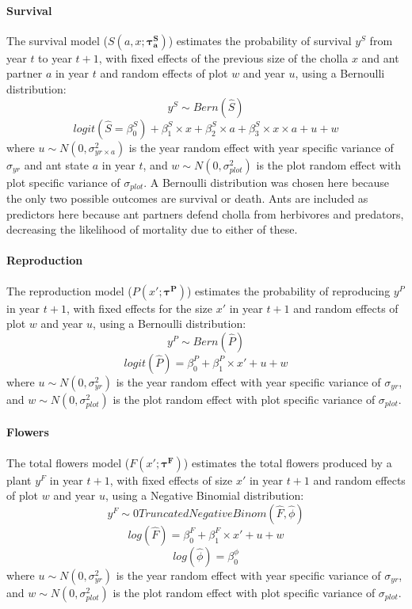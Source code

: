 \documentclass[11pt]{article}
\begin{document}
\paragraph{Survival}
The survival model ($S(a,x;\pmb{\tau_{a}^{S}})$) estimates the probability of survival $y^S$ from year $t$ to year $t+1$, with fixed effects of the previous size of the cholla $x$ and ant partner $a$ in year $t$ and random effects of plot $w$ and year $u$, using a Bernoulli distribution:
$$y^S \sim Bern(\hat{S})$$
$$logit(\hat{S} = \beta_{0}^{S}) + \beta_{1}^{S} \times x + \beta_{2}^{S} \times a + \beta_{3}^{S} \times x \times a + u + w$$
where $u \sim N(0,\sigma_{yr \times a}^{2})$ is the year random effect with year specific variance of $\sigma_{yr}$ and ant state $a$ in year $t$, and $w \sim N(0,\sigma_{plot}^{2})$ is the plot random effect with plot specific variance of $\sigma_{plot}$.
A Bernoulli distribution was chosen here because the only two possible outcomes are survival or death. 
Ants are included as predictors here because ant partners defend cholla from herbivores and predators, decreasing the likelihood of mortality due to either of these. 

\paragraph{Reproduction}
The reproduction model ($P(x';\pmb{\tau^{P}})$) estimates the probability of reproducing $y^P$ in year $t+1$, with fixed effects for the size $x'$ in year $t+1$ and random effects of plot $w$ and year $u$, using a Bernoulli distribution:
$$y^P \sim Bern(\hat{P})$$
$$logit(\hat{P}) = \beta_{0}^{P} + \beta_{1}^{P} \times x' + u + w$$
where $u \sim N(0,\sigma_{yr}^{2})$ is the year random effect with year specific variance of $\sigma_{yr}$, and $w \sim N(0,\sigma_{plot}^{2})$ is the plot random effect with plot specific variance of $\sigma_{plot}$.

\paragraph{Flowers}
The total flowers model ($F(x';\pmb{\tau^{F}})$) estimates the total flowers produced by a plant $y^F$ in year $t+1$, with fixed effects of size $x'$ in year $t+1$ and random effects of plot $w$ and year $u$, using a Negative Binomial distribution:
$$y^{F} \sim 0 Truncated Negative Binom(\hat{F},\hat{\phi})$$
$$log(\hat{F}) = \beta_{0}^{F} + \beta_{1}^{F} \times x' + u + w$$
$$log(\hat{\phi}) = \beta_{0}^{\phi}$$
where $u \sim N(0,\sigma_{yr}^{2})$ is the year random effect with year specific variance of $\sigma_{yr}$, and $w \sim N(0,\sigma_{plot}^{2})$ is the plot random effect with plot specific variance of $\sigma_{plot}$.
\end{document}

